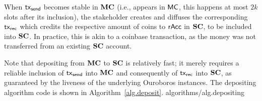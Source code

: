     When $\mathsf{tx}_{\mathsf{send}}$ becomes stable in $\mathbf{MC}$ (i.e., appears in
    $\mathsf{MC}$, this happens at
    most $2k$ slots after its inclusion),
    the stakeholder creates and diffuses the corresponding $\mathsf{tx}_{\mathsf{rec}}$
    which credits the respective amount of coins to $\mathsf{rAcc}$ in $\mathbf{SC}$,
    to be included into $\mathbf{SC}$.
    In practice, this is akin to a coinbase
    transaction, as the money was not transferred from an existing $\mathbf{SC}$
    account.



Note that depositing from $\mathbf{MC}$ to $\mathbf{SC}$ is relatively fast; it merely requires
a reliable inclusion of $\mathsf{tx}_{\mathsf{send}}$ into $\mathbf{MC}$ and
consequently of $\mathsf{tx}_{\mathsf{rec}}$ into $\mathbf{SC}$, as guaranteed
by the liveness of the underlying Ouroboros instances.
The depositing algorithm code is shown in
Algorithm~\ref{alg.deposit}.
{algorithms/alg.depositing}


